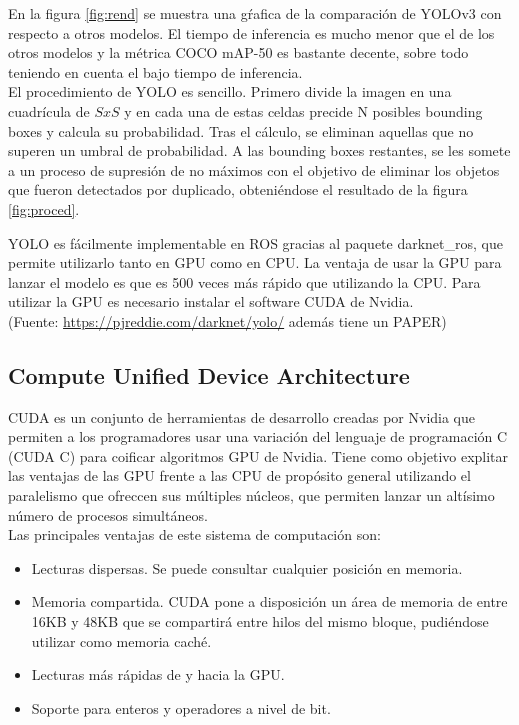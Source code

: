En la figura \ref{fig:rend} se muestra una gŕafica de la comparación de YOLOv3 con respecto a otros modelos. El tiempo de inferencia es mucho menor que el de los otros modelos y la métrica COCO mAP-50 es bastante decente, sobre todo teniendo en cuenta el bajo tiempo de inferencia.\\

El procedimiento de YOLO es sencillo. Primero divide la imagen en una cuadrícula de $SxS$ y en cada una de estas celdas precide N posibles bounding boxes y calcula su probabilidad. Tras el cálculo, se eliminan aquellas que no superen un umbral de probabilidad. A las bounding boxes restantes, se les somete a un proceso de supresión de no máximos con el objetivo de eliminar los objetos que fueron detectados por duplicado, obteniéndose el resultado de la figura \ref{fig:proced}.\\


YOLO es fácilmente implementable en ROS gracias al paquete darknet\_ros, que permite utilizarlo tanto en GPU como en CPU. La ventaja de usar la GPU para lanzar el modelo es que es 500 veces más rápido que utilizando la CPU. Para utilizar la GPU es necesario instalar el software CUDA de Nvidia.\\

(Fuente: \url{https://pjreddie.com/darknet/yolo/} además tiene un PAPER)\\

\subsection{Compute Unified Device Architecture}

CUDA es un conjunto de herramientas de desarrollo creadas por Nvidia que permiten a los programadores usar una variación del lenguaje de programación C (CUDA C) para coificar algoritmos GPU de Nvidia. Tiene como objetivo explitar las ventajas de las GPU frente a las CPU de propósito general utilizando el paralelismo que ofreccen sus múltiples núcleos, que permiten lanzar un altísimo número de procesos simultáneos.\\

Las principales ventajas de este sistema de computación son:

\begin{itemize}

	\item Lecturas dispersas. Se puede consultar cualquier posición en memoria.
	\item Memoria compartida. CUDA pone a disposición un área de memoria de entre 16KB y 48KB que se compartirá entre hilos del mismo bloque, pudiéndose utilizar como memoria caché.
	\item Lecturas más rápidas de y hacia la GPU.
	\item Soporte para enteros y operadores a nivel de bit.

\end{itemize}

